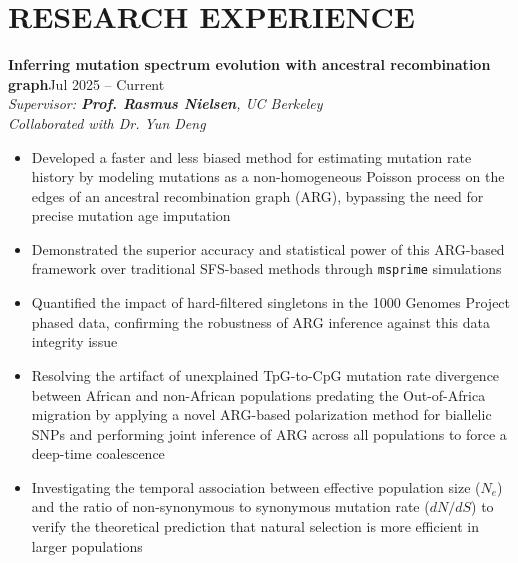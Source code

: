 \documentclass[a4paper,10pt]{extarticle}
\begin{document}
\section*{RESEARCH EXPERIENCE}
\noindent
\textbf{Inferring mutation spectrum evolution with ancestral recombination graph}\hfill Jul 2025 -- Current \\
\textit{Supervisor: \textbf{Prof. Rasmus Nielsen}, UC Berkeley} \\
\textit{Collaborated with Dr. Yun Deng}
\begin{itemize}
    \item Developed a faster and less biased method for estimating mutation rate history by modeling mutations as a non-homogeneous Poisson process on the edges of an ancestral recombination graph (ARG), bypassing the need for precise mutation age imputation    
    \item Demonstrated the superior accuracy and statistical power of this ARG-based framework over traditional SFS-based methods through \texttt{msprime} simulations
    \item Quantified the impact of hard-filtered singletons in the 1000 Genomes Project phased data, confirming the robustness of ARG inference against this data integrity issue
    \item Resolving the artifact of unexplained TpG-to-CpG mutation rate divergence between African and non-African populations predating the Out-of-Africa migration by applying a novel ARG-based polarization method for biallelic SNPs and performing joint inference of ARG across all populations to force a deep-time coalescence
    \item Investigating the temporal association between effective population size ($N_e$) and the ratio of non-synonymous to synonymous mutation rate ($dN/dS$) to verify the theoretical prediction that natural selection is more efficient in larger populations
\end{itemize}

\vspace{0.5\baselineskip}
\end{document}
